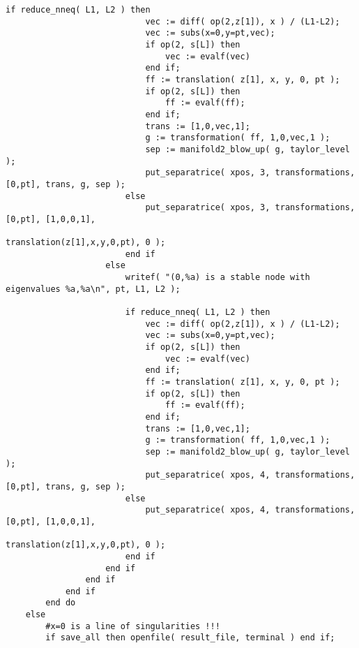 \documentclass[a4paper,10pt]{article}
\begin{document}
\begin{lstlisting}[name=blowup]
                        if reduce_nneq( L1, L2 ) then
                            vec := diff( op(2,z[1]), x ) / (L1-L2);
                            vec := subs(x=0,y=pt,vec);
                            if op(2, s[L]) then
                                vec := evalf(vec)
                            end if;
                            ff := translation( z[1], x, y, 0, pt );
                            if op(2, s[L]) then
                                ff := evalf(ff);
                            end if;
                            trans := [1,0,vec,1];
                            g := transformation( ff, 1,0,vec,1 );
                            sep := manifold2_blow_up( g, taylor_level );
                            put_separatrice( xpos, 3, transformations, [0,pt], trans, g, sep );
                        else
                            put_separatrice( xpos, 3, transformations, [0,pt], [1,0,0,1],
                                            translation(z[1],x,y,0,pt), 0 );
                        end if
                    else
                        writef( "(0,%a) is a stable node with eigenvalues %a,%a\n", pt, L1, L2 );

                        if reduce_nneq( L1, L2 ) then
                            vec := diff( op(2,z[1]), x ) / (L1-L2);
                            vec := subs(x=0,y=pt,vec);
                            if op(2, s[L]) then
                                vec := evalf(vec)
                            end if;
                            ff := translation( z[1], x, y, 0, pt );
                            if op(2, s[L]) then
                                ff := evalf(ff);
                            end if;
                            trans := [1,0,vec,1];
                            g := transformation( ff, 1,0,vec,1 );
                            sep := manifold2_blow_up( g, taylor_level );
                            put_separatrice( xpos, 4, transformations, [0,pt], trans, g, sep );
                        else
                            put_separatrice( xpos, 4, transformations, [0,pt], [1,0,0,1],
                                            translation(z[1],x,y,0,pt), 0 );
                        end if
                    end if
                end if
            end if
        end do
    else
        #x=0 is a line of singularities !!!
        if save_all then openfile( result_file, terminal ) end if;


\end{lstlisting}
\end{document}
